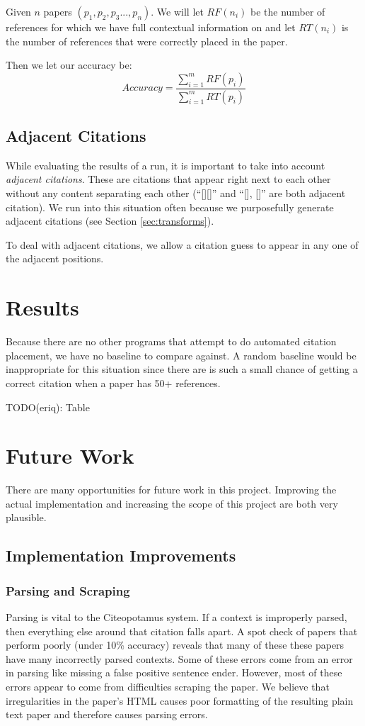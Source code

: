 \documentclass[10pt, conference, compsocconf]{IEEEtran}
\begin{document}
Given $n$ papers $(p_{1}, p_{2}, p_{3} ..., p_{n})$. We will let $RF(n_{i})$ be the number of references
for which we have full contextual information on and let $RT(n_{i})$ is the number of references
that were correctly placed in the paper.

Then we let our accuracy be:
$$Accuracy = \frac{\sum_{i = 1}^{m} RF(p_{i})}{\sum_{i = 1}^{m} RT(p_{i})}$$

\subsection{Adjacent Citations}
While evaluating the results of a run, it is important to take into account \textit{adjacent citations}.
These are citations that appear right next to each other without any content separating each other (``[][]'' and ``[], []''
are both adjacent citation). We run into this situation often because we purposefully generate adjacent citations (see
Section \ref{sec:transforms}).

To deal with adjacent citations, we allow a citation guess to appear in any one of the adjacent positions.

\section{Results}\label{sec:results}
Because there are no other programs that attempt to do automated citation placement, we have no baseline to compare against.
A random baseline would be inappropriate for this situation since there are is such a small chance of getting a correct
citation when a paper has 50+ references.

TODO(eriq): Table

\section{Future Work}\label{sec:future}
There are many opportunities for future work in this project.
Improving the actual implementation and increasing the scope of this project are both very plausible.

\subsection{Implementation Improvements}

\subsubsection{Parsing and Scraping}
Parsing is vital to the Citeopotamus system. If a context is improperly parsed, then everything else around that citation falls apart.
A spot check of papers that perform poorly (under 10\% accuracy) reveals that many of these these papers have many incorrectly parsed contexts.
Some of these errors come from an error in parsing like missing a false positive sentence ender. However, most of these errors appear to
come from difficulties scraping the paper. We believe that irregularities in the paper's HTML causes poor formatting of the resulting
plain text paper and therefore causes parsing errors.
\end{document}
